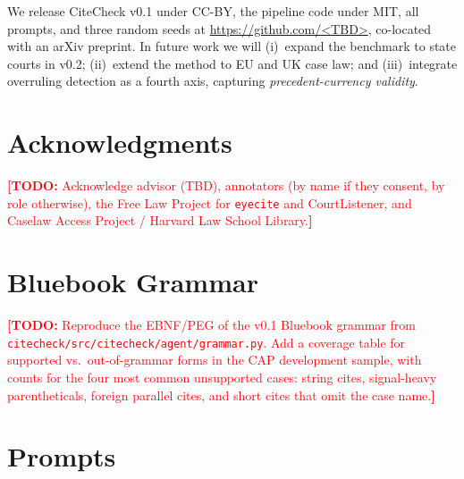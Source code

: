 \documentclass[11pt]{article}
\newcommand{\todo}[1]{\textcolor{red}{\textbf{[TODO:} #1\textbf{]}}}
\begin{document}
We release CiteCheck v0.1 under CC-BY, the pipeline code under MIT,
all prompts, and three random seeds at
\url{https://github.com/<TBD>}, co-located with an arXiv preprint.
In future work we will (i)~expand the benchmark to state courts in
v0.2; (ii)~extend the method to EU and UK case law; and
(iii)~integrate overruling detection
\citep{zhang2025overruled} as a fourth axis, capturing
\emph{precedent-currency validity}.

\section*{Acknowledgments}
\todo{Acknowledge advisor (TBD), annotators (by name if they
consent, by role otherwise), the Free Law Project for \texttt{eyecite}
and CourtListener, and Caselaw Access Project / Harvard Law School
Library.}




\appendix

\section{Bluebook Grammar}
\label{app:grammar}

\todo{Reproduce the EBNF/PEG of the v0.1 Bluebook grammar from
\texttt{citecheck/src/citecheck/agent/grammar.py}. Add a coverage
table for supported vs.\ out-of-grammar forms in the CAP development
sample, with counts for the four most common unsupported cases:
string cites, signal-heavy parentheticals, foreign parallel cites,
and short cites that omit the case name.}

\section{Prompts}
\label{app:prompts}
\end{document}
